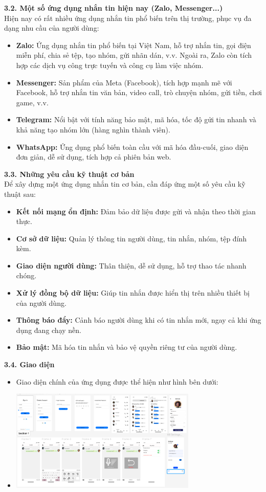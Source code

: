 \documentclass[12pt,a4paper]{article}
\begin{document}
	\textbf{3.2. Một số ứng dụng nhắn tin hiện nay (Zalo, Messenger...)} \\
	Hiện nay có rất nhiều ứng dụng nhắn tin phổ biến trên thị trường, phục vụ đa dạng nhu cầu của người dùng:
	\begin{itemize}
		\item \textbf{Zalo:} Ứng dụng nhắn tin phổ biến tại Việt Nam, hỗ trợ nhắn tin, gọi điện miễn phí, chia sẻ tệp, tạo nhóm, gửi nhãn dán, v.v. Ngoài ra, Zalo còn tích hợp các dịch vụ công trực tuyến và công cụ làm việc nhóm.
		\item \textbf{Messenger:} Sản phẩm của Meta (Facebook), tích hợp mạnh mẽ với Facebook, hỗ trợ nhắn tin văn bản, video call, trò chuyện nhóm, gửi tiền, chơi game, v.v.
		\item \textbf{Telegram:} Nổi bật với tính năng bảo mật, mã hóa, tốc độ gửi tin nhanh và khả năng tạo nhóm lớn (hàng nghìn thành viên).
		\item \textbf{WhatsApp:} Ứng dụng phổ biến toàn cầu với mã hóa đầu-cuối, giao diện đơn giản, dễ sử dụng, tích hợp cả phiên bản web.
	\end{itemize}
	
	\textbf{3.3. Những yêu cầu kỹ thuật cơ bản} \\
	Để xây dựng một ứng dụng nhắn tin cơ bản, cần đáp ứng một số yêu cầu kỹ thuật sau:
	\begin{itemize}
		\item \textbf{Kết nối mạng ổn định:} Đảm bảo dữ liệu được gửi và nhận theo thời gian thực.
		\item \textbf{Cơ sở dữ liệu:} Quản lý thông tin người dùng, tin nhắn, nhóm, tệp đính kèm.
		\item \textbf{Giao diện người dùng:} Thân thiện, dễ sử dụng, hỗ trợ thao tác nhanh chóng.
		\item \textbf{Xử lý đồng bộ dữ liệu:} Giúp tin nhắn được hiển thị trên nhiều thiết bị của người dùng.
		\item \textbf{Thông báo đẩy:} Cảnh báo người dùng khi có tin nhắn mới, ngay cả khi ứng dụng đang chạy nền.
		\item \textbf{Bảo mật:} Mã hóa tin nhắn và bảo vệ quyền riêng tư của người dùng.
	\end{itemize}
	\textbf{3.4. Giao diện}
	\begin{itemize}
		\item Giao diện chính của ứng dụng được thể hiện như hình bên dưới:
		\item[]
		\begin{center}
			\includegraphics[width=0.7\textwidth]{giaodien.png}
		\end{center}
	\end{itemize}
\end{document}

